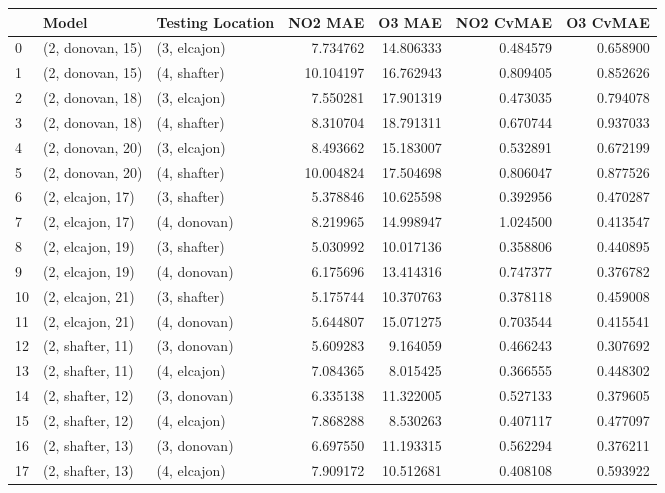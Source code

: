 \begin{tabular}{lllrrrr}
\toprule
{} &             Model & Testing Location &    NO2 MAE &     O3 MAE &  NO2 CvMAE &  O3 CvMAE \\
\midrule
0  &  (2, donovan, 15) &     (3, elcajon) &   7.734762 &  14.806333 &   0.484579 &  0.658900 \\
1  &  (2, donovan, 15) &     (4, shafter) &  10.104197 &  16.762943 &   0.809405 &  0.852626 \\
2  &  (2, donovan, 18) &     (3, elcajon) &   7.550281 &  17.901319 &   0.473035 &  0.794078 \\
3  &  (2, donovan, 18) &     (4, shafter) &   8.310704 &  18.791311 &   0.670744 &  0.937033 \\
4  &  (2, donovan, 20) &     (3, elcajon) &   8.493662 &  15.183007 &   0.532891 &  0.672199 \\
5  &  (2, donovan, 20) &     (4, shafter) &  10.004824 &  17.504698 &   0.806047 &  0.877526 \\
6  &  (2, elcajon, 17) &     (3, shafter) &   5.378846 &  10.625598 &   0.392956 &  0.470287 \\
7  &  (2, elcajon, 17) &     (4, donovan) &   8.219965 &  14.998947 &   1.024500 &  0.413547 \\
8  &  (2, elcajon, 19) &     (3, shafter) &   5.030992 &  10.017136 &   0.358806 &  0.440895 \\
9  &  (2, elcajon, 19) &     (4, donovan) &   6.175696 &  13.414316 &   0.747377 &  0.376782 \\
10 &  (2, elcajon, 21) &     (3, shafter) &   5.175744 &  10.370763 &   0.378118 &  0.459008 \\
11 &  (2, elcajon, 21) &     (4, donovan) &   5.644807 &  15.071275 &   0.703544 &  0.415541 \\
12 &  (2, shafter, 11) &     (3, donovan) &   5.609283 &   9.164059 &   0.466243 &  0.307692 \\
13 &  (2, shafter, 11) &     (4, elcajon) &   7.084365 &   8.015425 &   0.366555 &  0.448302 \\
14 &  (2, shafter, 12) &     (3, donovan) &   6.335138 &  11.322005 &   0.527133 &  0.379605 \\
15 &  (2, shafter, 12) &     (4, elcajon) &   7.868288 &   8.530263 &   0.407117 &  0.477097 \\
16 &  (2, shafter, 13) &     (3, donovan) &   6.697550 &  11.193315 &   0.562294 &  0.376211 \\
17 &  (2, shafter, 13) &     (4, elcajon) &   7.909172 &  10.512681 &   0.408108 &  0.593922 \\

\end{tabular}
